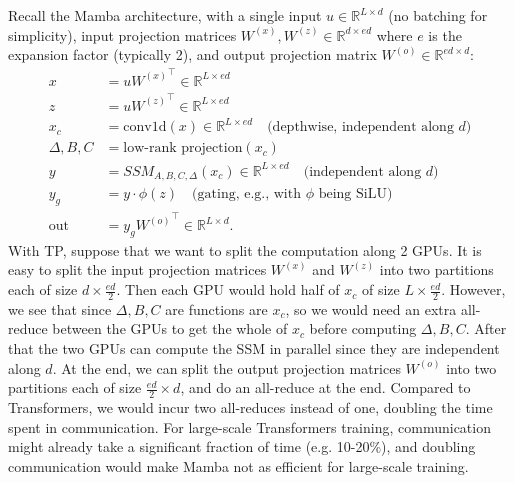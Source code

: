 Recall the Mamba architecture, with a single input $u \in \mathbb{R}^{L \times d}$ (no batching for simplicity), input projection matrices $W^{(x)}, W^{(z)} \in \mathbb{R}^{d \times ed}$ where $e$ is the expansion factor (typically 2), and output projection matrix $W^{(o)} \in \mathbb{R}^{ed \times d}$:
\begin{align*}
   x &= u {W^{(x)}}^\top \in \mathbb{R}^{L \times ed} \\
   z &= u {W^{(z)}}^\top \in \mathbb{R}^{L \times ed} \\
   x_c &= \mathrm{conv1d}(x) \in \mathbb{R}^{L \times ed} \quad \text{(depthwise, independent along $d$)} \\
   \Delta, B, C &= \text{low-rank projection}(x_c) \\
   y &= SSM_{A, B, C, \Delta}(x_c) \in \mathbb{R}^{L \times ed} \quad \text{(independent along $d$)} \\
   y_g &= y \cdot \phi(z)  \quad \text{(gating, e.g., with $\phi$ being SiLU)} \\
  \mathrm{out} &= y_g {W^{(o)}}^\top \in \mathbb{R}^{L \times d}.
\end{align*}
With TP, suppose that we want to split the computation along 2 GPUs. It is easy to split the input projection matrices $W^{(x)}$ and $W^{(z)}$ into two partitions each of size $d \times \frac{ed}{2}$.
Then each GPU would hold half of $x_c$ of size $L \times \frac{ed}{2}$.
However, we see that since $\Delta, B, C$ are functions are $x_c$, so we would need an extra all-reduce between the GPUs to get the whole of $x_c$ before computing $\Delta, B, C$.
After that the two GPUs can compute the SSM in parallel since they are independent along $d$.
At the end, we can split the output projection matrices $W^{(o)}$ into two partitions each of size $\frac{ed}{2} \times d$, and do an all-reduce at the end.
Compared to Transformers, we would incur two all-reduces instead of one, doubling the time spent in communication. For large-scale Transformers training, communication might already take a significant fraction of time (e.g. 10-20\%), and doubling communication would make Mamba not as efficient for large-scale training.

